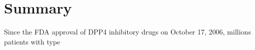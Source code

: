 \section{\label{chap:Sum} Summary}
Since the FDA approval of DPP4 inhibitory drugs on October 17, 2006, millions patients with type 
